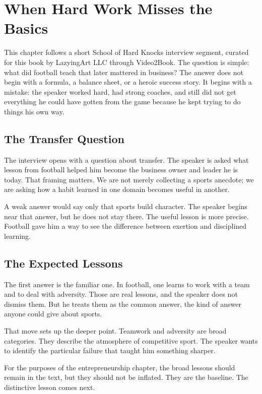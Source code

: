 \chapter{When Hard Work Misses the Basics}

This chapter follows a short School of Hard Knocks interview segment, curated for this book by LazyingArt LLC through Video2Book. The question is simple: what did football teach that later mattered in business? The answer does not begin with a formula, a balance sheet, or a heroic success story. It begins with a mistake: the speaker worked hard, had strong coaches, and still did not get everything he could have gotten from the game because he kept trying to do things his own way.

\section{The Transfer Question}

The interview opens with a question about transfer. The speaker is asked what lesson from football helped him become the business owner and leader he is today. That framing matters. We are not merely collecting a sports anecdote; we are asking how a habit learned in one domain becomes useful in another.

A weak answer would say only that sports build character. The speaker begins near that answer, but he does not stay there. The useful lesson is more precise. Football gave him a way to see the difference between exertion and disciplined learning.

\section{The Expected Lessons}

The first answer is the familiar one. In football, one learns to work with a team and to deal with adversity. Those are real lessons, and the speaker does not dismiss them. But he treats them as the common answer, the kind of answer anyone could give about sports.

That move sets up the deeper point. Teamwork and adversity are broad categories. They describe the atmosphere of competitive sport. The speaker wants to identify the particular failure that taught him something sharper.

\begin{remark}
For the purposes of the entrepreneurship chapter, the broad lessons should remain in the text, but they should not be inflated. They are the baseline. The distinctive lesson comes next.
\end{remark}

